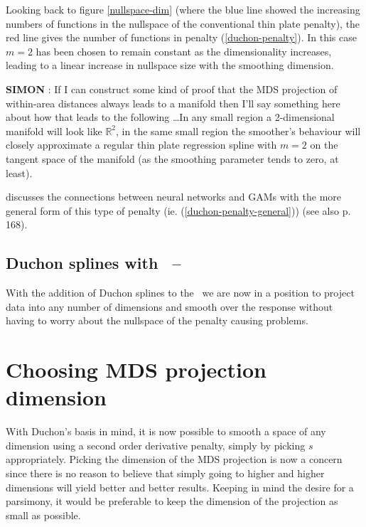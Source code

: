 Looking back to figure \ref{nullspace-dim} (where the blue line showed the increasing numbers of functions in the nullspace of the conventional thin plate penalty), the red line gives the number of functions in penalty (\ref{duchon-penalty}). In this case $m=2$ has been chosen to remain constant as the dimensionality increases, leading to a linear increase in nullspace size with the smoothing dimension.

\textbf{SIMON} : If I can construct some kind of proof that the MDS projection of within-area distances always leads to a manifold then I'll say something here about how that leads to the following \ldots In any small region a 2-dimensional manifold will look like $\mathbb{R}^2$, in the same small region the smoother's behaviour will closely approximate a regular thin plate regression spline with $m=2$ on the tangent space of the manifold (as the smoothing parameter tends to zero, at least).

\cite{girosi} discusses the connections between neural networks and GAMs with the more general form of this type of penalty (ie. (\ref{duchon-penalty-general})) (see also \cite{elements} p. 168).


\subsection{Duchon splines with \mdsap\ -- \mdsds}

With the addition of Duchon splines to the \mdsap\ we are now in a position to project data into any number of dimensions and smooth over the response without having to worry about the nullspace of the penalty causing problems.










\section{Choosing MDS projection dimension}

With Duchon's basis in mind, it is now possible to smooth a space of any dimension using a second order derivative penalty, simply by picking $s$ appropriately. Picking the dimension of the MDS projection is now a concern since there is no reason to believe that simply going to higher and higher dimensions will yield better and better results. Keeping in mind the desire for a parsimony, it would be preferable to keep the dimension of the projection as small as possible.

